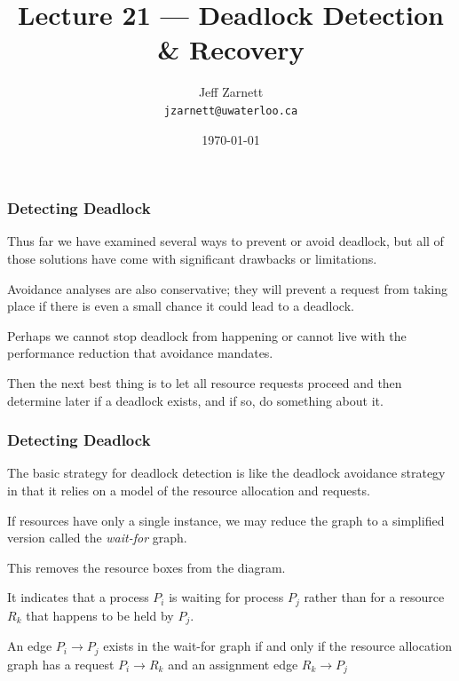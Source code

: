 

\title{Lecture 21 --- Deadlock Detection \& Recovery }

\author{Jeff Zarnett \\ \small \texttt{jzarnett@uwaterloo.ca}}
\date{\today}




\begin{frame}
  \titlepage

 \end{frame}


\begin{frame}
\frametitle{Detecting Deadlock}

Thus far we have examined several ways to prevent or avoid deadlock, but all of those solutions have come with significant drawbacks or limitations. 

Avoidance analyses are also conservative; they will prevent a request from taking place if there is even a small chance it could lead to a deadlock. 

Perhaps we cannot stop deadlock from happening or cannot live with the performance reduction that avoidance mandates.

Then the next best thing is to let all resource requests proceed and then determine later if a deadlock exists, and if so, do something about it.

\end{frame}


\begin{frame}
\frametitle{Detecting Deadlock}

The basic strategy for deadlock detection is like the deadlock avoidance strategy in that it relies on a model of the resource allocation and requests. 

If resources have only a single instance, we may reduce the graph to a simplified version called the \textit{wait-for} graph. 

This removes the resource boxes from the diagram.

It indicates that a process $P_{i}$ is waiting for process $P_{j}$ rather than for a resource $R_{k}$ that happens to be held by $P_{j}$. 

An edge $P_{i} \rightarrow P_{j}$ exists in the wait-for graph if and only if the resource allocation graph has a request $P_{i} \rightarrow R_{k}$ and an assignment edge $R_{k} \rightarrow P_{j}$

\end{frame}

